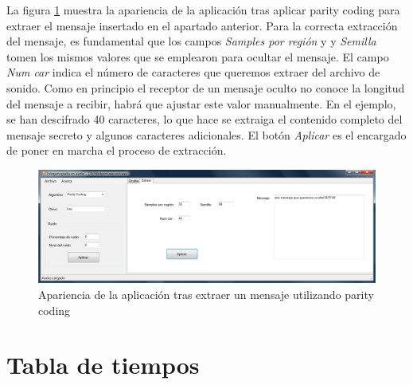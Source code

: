 \documentclass[12pt]{article}
\begin{document}
La figura \ref{ss5} muestra la apariencia de la aplicación tras aplicar parity coding para extraer el mensaje insertado en el apartado anterior. Para la correcta extracción del mensaje, es fundamental que los campos \emph{Samples por región} y y \emph{Semilla} tomen los mismos valores que se emplearon para ocultar el mensaje. El campo \emph{Num car} indica el número de caracteres que queremos extraer del archivo de sonido. Como en principio el receptor de un mensaje oculto no conoce la longitud del mensaje a recibir, habrá que ajustar este valor manualmente. En el ejemplo, se han descifrado 40 caracteres, lo que hace se extraiga el contenido completo del mensaje secreto y algunos caracteres adicionales. El botón \emph{Aplicar} es el encargado de poner en marcha el proceso de extracción.

\begin{figure}[h]
  \centering
    \includegraphics[width=\textwidth]{img/ss5}
  \caption{Apariencia de la aplicación tras extraer un mensaje utilizando parity coding}
  \label{ss5}
\end{figure}

\clearpage
\section{Tabla de tiempos}
\end{document}

